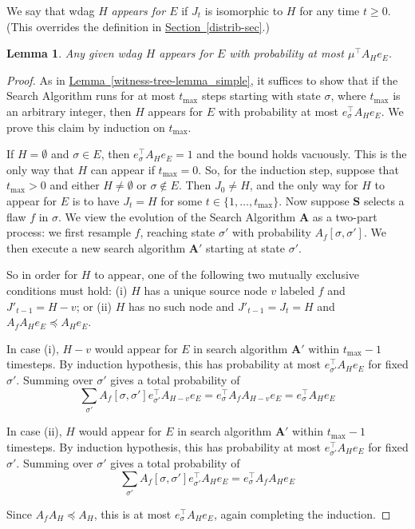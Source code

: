 \documentclass[11pt]{article}
\newcommand{\expref}[2]{\texorpdfstring{\hyperref[#2]{#1~\ref{#2}}}{#1~\ref{#2}}}
\newtheorem{lemma}[theorem]{Lemma}
\begin{document}
We say that wdag $H$ \emph{appears for $E$} if $J_t$ is isomorphic to $H$ for any time $t \geq 0$.  (This overrides the definition in \expref{Section}{distrib-sec}.)

\begin{lemma}
\label{jtappear}
Any given wdag $H$ appears for $E$ with probability at most $\mu^{\top} A_H e_E$.
\end{lemma}
\begin{proof}
As in \expref{Lemma}{witness-tree-lemma_simple}, it suffices to show that if the Search Algorithm runs for at most $t_{\max}$ steps starting with state $\sigma$, where $t_{\max}$ is an arbitrary integer, then $H$ appears for $E$ with probability at most $e_{\sigma}^{\top} A_H e_E.$ We prove this claim by induction on $t_{\max}$. 

If $H = \emptyset$ and $\sigma \in E$, then $e_{\sigma}^{\top} A_H e_E = 1$ and the bound holds vacuously. This is the only way that $H$ can appear if $t_{\max} = 0$. So, for the induction step, suppose that $t_{\max} > 0$ and either $H \neq \emptyset$ or $\sigma \not \in E$. Then $J_0 \neq H$, and the only way for $H$ to appear for $E$ is to have $J_t = H$ for some $t \in \{1, \dots, t_{\max} \}$. Now suppose $\mathbf S$ selects a flaw $f$  in $\sigma$. We view the evolution of the Search Algorithm $\mathbf A$ as a two-part process: we first resample $f$, reaching state $\sigma'$ with probability $A_{f}[ \sigma, \sigma']$. We then execute a new search algorithm $\mathbf A'$ starting at state $\sigma'$. 

So in order for $H$ to appear, one of the following two mutually exclusive conditions must hold:  (i) $H$ has a unique source node $v$ labeled $f$ and $J'_{t-1} = H - v$; or  (ii) $H$ has no such node and $J'_{t-1} = J_t = H$ and $A_f A_H e_E \preceq A_H e_E$.

In case (i), $H - v$ would appear for $E$ in search algorithm $\mathbf A'$ within $t_{\max} - 1$ timesteps. By induction hypothesis, this has  probability at most $e_{\sigma'}^{\top} A_H e_E$ for fixed $\sigma'$. Summing over $\sigma'$ gives a total probability of 
$$
\sum_{\sigma'} A_f[\sigma, \sigma'] e_{\sigma'}^{\top} A_{H-v} e_E = e_{\sigma}^{\top} A_f  A_{H-v} e_E = e_{\sigma}^{\top} A_H e_E
$$ 

In case (ii), $H $ would appear for $ E$ in search algorithm $\mathbf A'$ within $t_{\max} - 1$ timesteps. By induction hypothesis, this has  probability at most $e_{\sigma'}^{\top} A_H e_E$ for fixed $\sigma'$. Summing over $\sigma'$ gives a total probability of 
$$
\sum_{\sigma'} A_f[\sigma, \sigma'] e_{\sigma'}^{\top} A_{H} e_E = e_{\sigma}^{\top} A_f  A_{H} e_E
$$

Since $A_f A_H \preceq A_H$, this is at most $e_{\sigma}^{\top} A_H e_E$, again completing the induction.
\end{proof}
\end{document}
